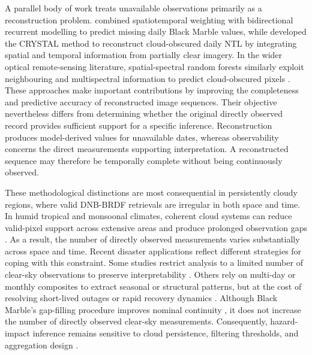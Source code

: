 \documentclass[]{interact}
\theoremstyle{plain}%
\theoremstyle{definition}
\theoremstyle{remark}
\begin{document}
    A parallel body of work treats unavailable observations primarily as a reconstruction problem. \citet{Hao2023_GRS_BlackMarbleGapFilling} combined spatiotemporal weighting with bidirectional recurrent modelling to predict missing daily Black Marble values, while \citet{Tan2023_RSE_CRYSTAL} developed the CRYSTAL method to reconstruct cloud-obscured daily NTL by integrating spatial and temporal information from partially clear imagery. In the wider optical remote-sensing literature, spatial-spectral random forests similarly exploit neighbouring and multispectral information to predict cloud-obscured pixels \citep{Wang2022_SRS_SSRF}. These approaches make important contributions by improving the completeness and predictive accuracy of reconstructed image sequences. Their objective nevertheless differs from determining whether the original directly observed record provides sufficient support for a specific inference. Reconstruction produces model-derived values for unavailable dates, whereas observability concerns the direct measurements supporting interpretation. A reconstructed sequence may therefore be temporally complete without being continuously observed.
    
    These methodological distinctions are most consequential in persistently cloudy regions, where valid DNB-BRDF retrievals are irregular in both space and time. In humid tropical and monsoonal climates, coherent cloud systems can reduce valid-pixel support across extensive areas and produce prolonged observation gaps \citep{Zhao2019_RS_Review,Skoufias2021_GNHR_VIIRS_Hazards}. As a result, the number of directly observed measurements varies substantially across space and time. Recent disaster applications reflect different strategies for coping with this constraint. Some studies restrict analysis to a limited number of clear-sky observations to preserve interpretability \citep{Hu2025_UrbanClimate_FloodResilience}. Others rely on multi-day or monthly composites to extract seasonal or structural patterns, but at the cost of resolving short-lived outages or rapid recovery dynamics \citep{Mokhtari2025_SciRep_CoastalZones}. Although Black Marble’s gap-filling procedure improves nominal continuity \citep{Roman2018_RSE_BlackMarble}, it does not increase the number of directly observed clear-sky measurements. Consequently, hazard-impact inference remains sensitive to cloud persistence, filtering thresholds, and aggregation design \citep{Levin2025_RSE_NTL_Agenda,Zheng2023_ISPRSJPRS_UrbanReview}.
\end{document}
